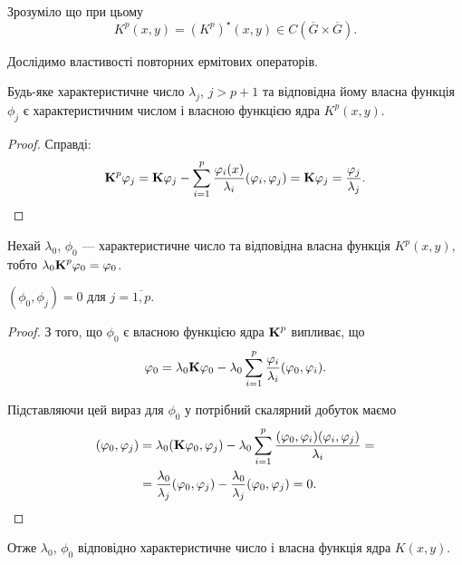 Зрозуміло що при цьому
\begin{equation}
	K^p(x, y) = (K^p)^\star (x, y) \in  C\left(\overline G \times \overline G\right).
\end{equation}

Дослідимо властивості повторних ермітових операторів.

\begin{proposition}
	Будь-яке характеристичне число $\lambda_j$, $j > p + 1$ та відповідна йому власна функція $\phi_j$ є характеристичним числом і власною функцією ядра $K^p(x,y)$.
\end{proposition}

\begin{proof}
	Справді:
	\begin{equation}
		\bf{K}^p \phi_j = \bf{K} \phi_j - \Sum_{i = 1}^p \dfrac{\phi_i(x)}{\lambda_i} (\phi_i, \phi_j) = \bf{K} \phi_j = \dfrac{\phi_j}{\lambda_j}.
	\end{equation}
\end{proof}

Нехай $\lambda_0$, $\phi_0$ --- характеристичне число та відповідна власна функція $K^p(x, y)$, тобто $\lambda_0 \bf{K}^p \phi_0 = \phi_0$.

\begin{proposition}
	$(\phi_0, \phi_j) = 0$ для $j = \overline{1, p}$.
\end{proposition}

\begin{proof}
	З того, що $\phi_0$ є власною функцією ядра $\bf{K}^p$ випливає, що
	\begin{equation}
		\phi_0 = \lambda_0 \bf{K} \phi_0 - \lambda_0 \Sum_{i = 1}^p \dfrac{\phi_i}{\lambda_i} (\phi_0, \phi_i).
	\end{equation}

	Підставляючи цей вираз для $\phi_0$ у потрібний скалярний добуток маємо
	\begin{equation}
		\begin{aligned}
			(\phi_0, \phi_j) &= \lambda_0 (\bf{K} \phi_0, \phi_j) - \lambda_0 \Sum_{i = 1}^p \dfrac{(\phi_0, \phi_i)(\phi_i, \phi_j)}{\lambda_i} = \\
			&= \dfrac{\lambda_0}{\lambda_j} (\phi_0, \phi_j) - \dfrac{\lambda_0}{\lambda_j} (\phi_0, \phi_j) = 0. 
		\end{aligned}
	\end{equation}
\end{proof}

Отже $\lambda_0$, $\phi_0$ відповідно характеристичне число і власна функція ядра $K(x, y)$. \medskip


